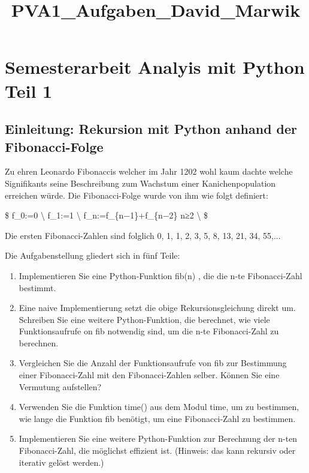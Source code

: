 \documentclass[11pt]{article}
\title{PVA1\_Aufgaben\_David\_Marwik}
\providecommand{\tightlist}{%
      \setlength{\itemsep}{0pt}\setlength{\parskip}{0pt}}
\begin{document}
    
    
    \maketitle
    
    

    
    \section{Semesterarbeit Analyis mit Python Teil
1}\label{semesterarbeit-analyis-mit-python-teil-1}

\subsection{Einleitung: Rekursion mit Python anhand der
Fibonacci-Folge}\label{einleitung-rekursion-mit-python-anhand-der-fibonacci-folge}

Zu ehren Leonardo Fibonaccis welcher im Jahr 1202 wohl kaum dachte
welche Signifikants seine Beschreibung zum Wachstum einer
Kanichenpopulation erreichen würde. Die Fibonacci-Folge wurde von ihm
wie folgt definiert:

\$ f\_0:=0 \textbackslash{} f\_1:=1 \textbackslash{}
f\_n:=f\_\{n−1\}+f\_\{n−2\}  n≥2 \textbackslash{} \$

Die ersten Fibonacci-Zahlen sind folglich 0, 1, 1, 2, 3, 5, 8, 13, 21,
34, 55,...

Die Aufgabenstellung gliedert sich in fünf Teile:

\begin{enumerate}
\def\labelenumi{\arabic{enumi}.}
\tightlist
\item
  Implementieren Sie eine Python-Funktion fib(n) , die die n-te
  Fibonacci-Zahl bestimmt.
\item
  Eine naive Implementierung setzt die obige Rekursionsgleichung direkt
  um. Schreiben Sie eine weitere Python-Funktion, die berechnet, wie
  viele Funktionsaufrufe on fib notwendig sind, um die n-te
  Fibonacci-Zahl zu berechnen.
\item
  Vergleichen Sie die Anzahl der Funktionsaufrufe von fib zur Bestimmung
  einer Fibonacci-Zahl mit den Fibonacci-Zahlen selber. Können Sie eine
  Vermutung aufstellen?
\item
  Verwenden Sie die Funktion time() aus dem Modul time, um zu bestimmen,
  wie lange die Funktion fib benötigt, um eine Fibonacci-Zahl zu
  bestimmen.
\item
  Implementieren Sie eine weitere Python-Funktion zur Berechnung der
  n-ten Fibonacci-Zahl, die möglichst effizient ist. (Hinweis: das kann
  rekursiv oder iterativ gelöst werden.)
\end{enumerate}
\end{document}
